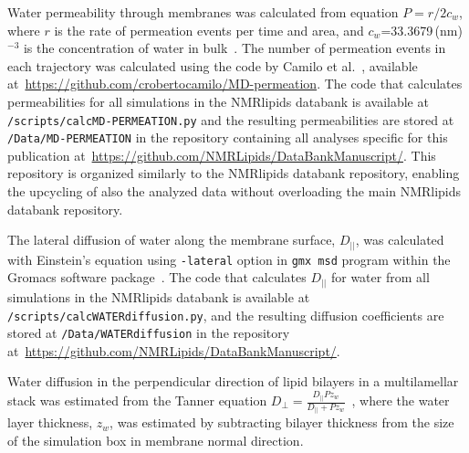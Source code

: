 \documentclass[fleqn,10pt]{wlscirep}
\begin{document}
Water permeability through membranes was calculated from equation $P=r/2c_w$, where $r$ is the rate of permeation events per time and area, and $c_w$=33.3679\,(nm)$^{-3}$ is the concentration of water in bulk~\cite{venable19}. The number of permeation events in each trajectory was calculated using the code by Camilo et al.~\cite{camilo2022}, available at~\url{https://github.com/crobertocamilo/MD-permeation}. 
The code that calculates permeabilities for all simulations in the NMRlipids databank is available at \texttt{/scripts/calcMD-PERMEATION.py} and the resulting permeabilities are stored at \texttt{/Data/MD-PERMEATION} in the repository containing all analyses specific for this publication at~\url{https://github.com/NMRLipids/DataBankManuscript/}. 
This repository is organized similarly to the NMRlipids databank repository, enabling the upcycling of also the analyzed data without overloading the main NMRlipids databank repository. 

The lateral diffusion of water along the membrane surface, $D_{||}$, was calculated with Einstein's equation using \texttt{-lateral} option in \texttt{gmx msd} program within the Gromacs software package~\cite{gromacsMANUAL}. The code that calculates $D_{||}$ for water from all simulations in the NMRlipids databank is available at \texttt{/scripts/calcWATERdiffusion.py}, and the resulting diffusion coefficients are stored at \texttt{/Data/WATERdiffusion} in the repository at~\url{https://github.com/NMRLipids/DataBankManuscript/}.

Water diffusion in the perpendicular direction of lipid bilayers in a multilamellar stack was estimated from the Tanner equation $D_\mathrm{\perp} = \frac{D_{||} P z_w}{D_{||} + P z_w}$~\cite{tanner78,wasterby02}, where the water layer thickness, $z_w$, was estimated by subtracting bilayer thickness from the size of the simulation box in membrane normal direction.
\end{document}
